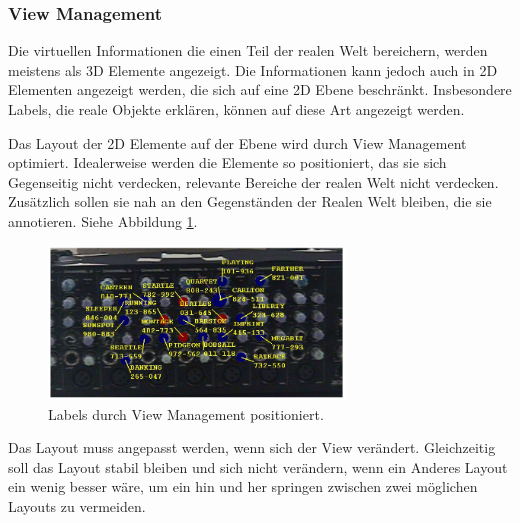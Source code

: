 \subsubsection{View Management}

%
%
%


Die virtuellen Informationen die einen Teil der realen Welt bereichern, werden meistens als 3D Elemente angezeigt. 
Die Informationen kann jedoch auch in 2D Elementen angezeigt werden, die sich auf eine 2D Ebene beschränkt. Insbesondere Labels, die reale Objekte erklären, können auf diese Art angezeigt werden.

Das Layout der 2D Elemente auf der Ebene wird durch View Management optimiert.
Idealerweise werden die Elemente so positioniert, das sie sich Gegenseitig nicht verdecken, relevante Bereiche der realen Welt nicht verdecken.
Zusätzlich sollen sie nah an den Gegenständen der Realen Welt bleiben, die sie annotieren. Siehe Abbildung \ref{viewManagement}.

\begin{figure}[H]
	\centering
	\includegraphics[width=0.7\textwidth]{images/ViewManagementImageFromPaper.PNG}
	\caption[]{Labels durch View Management positioniert.\citep{viewmanagement}}
	\label{viewManagement}
\end{figure}
Das Layout muss angepasst werden, wenn sich der View verändert. Gleichzeitig soll das Layout stabil bleiben und sich nicht verändern, wenn ein Anderes Layout ein wenig besser wäre, um ein hin und her springen zwischen zwei möglichen Layouts zu vermeiden.\citep{viewmanagement}

